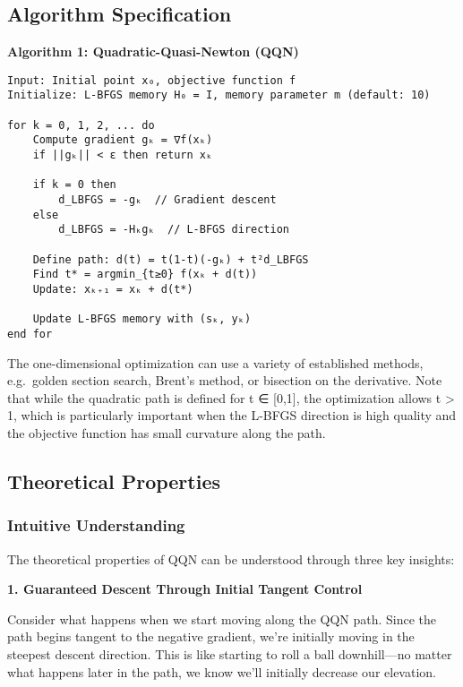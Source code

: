 \hypertarget{algorithm-specification}{%
\subsection{Algorithm Specification}\label{algorithm-specification}}

\textbf{Algorithm 1: Quadratic-Quasi-Newton (QQN)}

\begin{verbatim}
Input: Initial point x₀, objective function f
Initialize: L-BFGS memory H₀ = I, memory parameter m (default: 10)

for k = 0, 1, 2, ... do
    Compute gradient gₖ = ∇f(xₖ)
    if ||gₖ|| < ε then return xₖ

    if k = 0 then
        d_LBFGS = -gₖ  // Gradient descent
    else
        d_LBFGS = -Hₖgₖ  // L-BFGS direction

    Define path: d(t) = t(1-t)(-gₖ) + t²d_LBFGS
    Find t* = argmin_{t≥0} f(xₖ + d(t))
    Update: xₖ₊₁ = xₖ + d(t*)

    Update L-BFGS memory with (sₖ, yₖ)
end for
\end{verbatim}

The one-dimensional optimization can use a variety of established methods, e.g.~golden section search, Brent's method, or bisection on the derivative.
Note that while the quadratic path is defined for t ∈ {[}0,1{]}, the optimization allows t \textgreater{} 1, which is particularly important when the L-BFGS direction is high quality and the objective function has small curvature along the path.

\hypertarget{theoretical-properties}{%
\subsection{Theoretical Properties}\label{theoretical-properties}}

\hypertarget{intuitive-understanding}{%
\subsubsection{Intuitive Understanding}\label{intuitive-understanding}}

The theoretical properties of QQN can be understood through three key insights:

\textbf{1. Guaranteed Descent Through Initial Tangent Control}

Consider what happens when we start moving along the QQN path. Since the path begins tangent to the negative gradient, we're initially moving in the steepest descent direction. This is like starting to roll a ball downhill---no matter what happens later in the path, we know we'll initially decrease our elevation.

